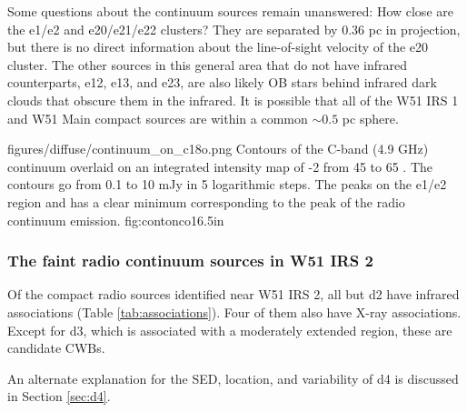 Some questions about the continuum sources remain unanswered: How close are the
e1/e2 and e20/e21/e22 clusters?  They are separated by 0.36 pc in projection,
but there is no direct information about the line-of-sight velocity of the e20
cluster.    The other sources in this general area that do not have infrared
counterparts, e12, e13, and e23, are also likely OB stars behind
infrared dark clouds that obscure them in the infrared.  It is possible that
all of the W51 IRS 1 and W51 Main compact sources are within a common $\sim
0.5$ pc sphere.


\Figure
{figures/diffuse/continuum_on_c18o.png}
{Contours of the C-band (4.9 GHz) continuum overlaid on an integrated intensity
map of -2 from 45 to 65 \kms \citep{Parsons2012a}.  The contours
go from 0.1 to 10 mJy in 5 logarithmic steps.  The \ceighteeno peaks on the
e1/e2 region and has a clear minimum corresponding to the peak of the radio
continuum emission.
}
{fig:contonco}{1}{6.5in}

\subsubsection{The faint radio continuum sources in W51 IRS 2}
\label{sec:faintw51irs2}

Of the compact radio sources identified near W51 IRS 2, all but d2 have infrared
associations (Table \ref{tab:associations}).  Four of them also have X-ray
associations.  Except for d3, which is associated with a moderately
extended \hii region, these are candidate CWBs.

An alternate explanation for the SED, location, and variability of d4 is
discussed in Section \ref{sec:d4}.



